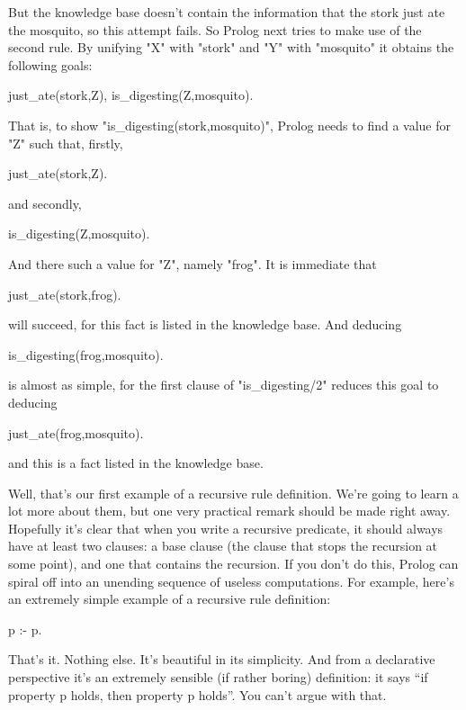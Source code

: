 But the knowledge base doesn't contain the information that the stork
just ate the mosquito, so this
attempt fails.  So Prolog next tries to make use of the second rule.
By unifying "X" with "stork" and "Y" with
"mosquito" it obtains the following goals:
\begin{LPNcodedisplay}
just_ate(stork,Z),
is_digesting(Z,mosquito).
\end{LPNcodedisplay}
That is, to show
"is\_digesting(stork,mosquito)", Prolog
needs to find a value for "Z" such that, firstly,
\begin{LPNcodedisplay}
just_ate(stork,Z).
\end{LPNcodedisplay}
and secondly,
\begin{LPNcodedisplay}
is_digesting(Z,mosquito).
\end{LPNcodedisplay}
And there  such a value for "Z", namely
"frog".  It is immediate that
\begin{LPNcodedisplay}
just_ate(stork,frog).
\end{LPNcodedisplay}
will succeed, for this fact is listed in the knowledge base.  And deducing
\begin{LPNcodedisplay}
is_digesting(frog,mosquito).
\end{LPNcodedisplay}
is almost as simple, for the first clause of "is\_digesting/2"
reduces this goal to deducing
\begin{LPNcodedisplay}
just_ate(frog,mosquito).
\end{LPNcodedisplay}
and this is a fact listed in the knowledge base.

Well, that's our first example of a recursive rule definition.  We're
going to learn a lot more about them, but one very practical remark
should be made right away.  Hopefully it's clear that when you write a
recursive predicate, it should always have at least two clauses: a
base clause (the clause that stops the recursion at some point), and
one that contains the recursion.  If you don't do this, Prolog can
spiral off into an unending sequence of useless computations.  For
example, here's an extremely simple example of a recursive rule
definition:
\begin{LPNcodedisplay}
p :- p.
\end{LPNcodedisplay}
That's it.  Nothing else.  It's beautiful in its simplicity.  And from
a declarative perspective it's an extremely sensible (if rather
boring) definition: it says ``if property p holds, then property
p holds''. You can't argue with that.

